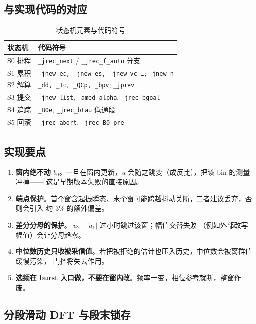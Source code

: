 \documentclass[11pt,a4paper]{ctexart}
\begin{document}
\subsection{与实现代码的对应}

\begin{table}[H]
\centering
\caption{状态机元素与代码符号}
\begin{tabular}{ll}
\toprule
状态机 & 代码符号\\
\midrule
S0 排程 & \texttt{\_jrec\_next} / \texttt{\_jrec\_f\_auto} 分支\\
S1 累积 & \texttt{\_jnew\_ec, \_jnew\_es, \_jnew\_vc \ldots}; \texttt{\_jnew\_n}\\
S2 解算 & \texttt{\_dd, \_Tc, \_QCp, \_bpv}; \texttt{\_jprev}\\
S3 提交 & \texttt{\_jnew\_list}, \texttt{\_amed\_alpha}, \texttt{\_jrec\_bgoal}\\
S4 追踪 & \texttt{\_B0e}, \texttt{\_jrec\_btau} 低通段\\
S5 回滚 & \texttt{\_jrec\_abort}, \texttt{\_jrec\_B0\_pre}\\
\bottomrule
\end{tabular}
\end{table}

\subsection{实现要点}

\begin{enumerate}
\item \textbf{窗内绝不动 $b_0$}。一旦在窗内更新，$u$ 会随之跳变（成反比），把该 bin 的测量冲掉——
这是早期版本失败的直接原因。
\item \textbf{端点保护}。首个窗含起振瞬态、末个窗可能跨越抖动关断，二者建议丢弃，否则会引入
约 $3\%$ 的额外偏差。
\item \textbf{差分分母的保护}。$\lvert\tilde u_2-\tilde u_1\rvert$ 过小时跳过该窗；幅值交替失败
（例如外部改写幅值）会让分母趋零。
\item \textbf{中位数历史只收被采信值}。若把被拒绝的估计也压入历史，中位数会被离群值缓慢污染，
门控将失去作用。
\item \textbf{选频在 burst 入口做，不要在窗内改}。频率一变，相位参考就断，整窗作废。
\end{enumerate}

\subsection{分段滑动 DFT 与段末锁存}
\label{sec:sdft}
\end{document}
